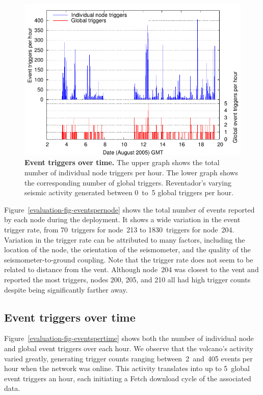 \begin{figure}[t]
\begin{center}
\includegraphics[width=\hsize]{./5-evaluation/figs/eventdetection/eruptionTriggers/eruptCountVsTime.pdf}
\end{center}
\caption{\textbf{Event triggers over time.}
The upper graph shows the total number of individual node triggers per hour.
The lower graph shows the corresponding number of global triggers.
Reventador's varying seismic activity generated between 0~to~5 global
triggers per hour.}
\label{fig-eventspertime}
\end{figure}

Figure~\ref{evaluation-fig-eventspernode} shows the total number of events reported by
each node during the deployment. It shows a wide variation in the event
trigger rate, from 70~triggers for node~213 to 1830~triggers for node~204.
Variation in the trigger rate can be attributed to many factors, including the
location of the node, the orientation of the seismometer, and the quality of
the seismometer-to-ground coupling.  Note that the trigger rate does not seem
to be related to distance from the vent. Although node~204 was closest 
to the vent and reported the most triggers, nodes 200, 205, and 210 
all had high trigger counts despite being significantly farther away.

\subsection{Event triggers over time}

Figure~\ref{evaluation-fig-eventspertime} shows both the number of individual node and
global event triggers over each hour. We observe
that the volcano's activity varied greatly, generating trigger counts ranging
between~2~and~405 events per hour when the network was online.  This activity
translates into up to 5~global event triggers an hour, each initiating a
Fetch download cycle of the associated data.

